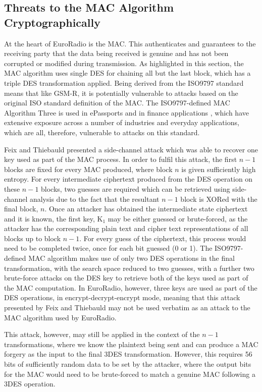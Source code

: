 \documentclass[twoside,11pt,a4paper]{article}
\begin{document}
\subsection{Threats to the MAC Algorithm Cryptographically}
At the heart of EuroRadio is the MAC. This authenticates and guarantees to the receiving party that the data being received is genuine and has not been corrupted or modified during transmission. As highlighted in this section, the MAC algorithm uses single DES for chaining all but the last block, which has a triple DES transformation applied. Being derived from the ISO9797 standard means that like GSM-R, it is potentially vulnerable to attacks based on the original ISO standard definition of the MAC. The ISO9797-defined MAC Algorithm Three is used in ePassports \citep{Chothia10a} and in finance applications \citep{IBM}, which have extensive exposure across a number of industries and everyday applications, which are all, therefore, vulnerable to attacks on this standard.

Feix and Thiebauld \citep{MACAlgo3SideChannel} presented a side-channel attack which was able to recover one key used as part of the MAC process. In order to fulfil this attack, the first $n - 1$ blocks are fixed for every MAC produced, where block $n$ is given sufficiently high entropy. For every intermediate ciphertext produced from the DES operation on these $n - 1$ blocks, two guesses are required which can be retrieved using side-channel analysis due to the fact that the resultant $n - 1$ block is XORed with the final block, $n$. Once an attacker has obtained the intermediate state ciphertext and it is known, the first key, K$_1$ may be either guessed or brute-forced, as the attacker has the corresponding plain text and cipher text representations of all blocks up to block $n - 1$. For every guess of the ciphertext, this process would need to be completed twice, once for each bit guessed (0 or 1). The ISO9797-defined MAC algorithm makes use of only two DES operations in the final transformation, with the search space reduced to two guesses, with a further two brute-force attacks on the DES key to retrieve both of the keys used as part of the MAC computation. In EuroRadio, however, three keys are used as part of the DES operations, in encrypt-decrypt-encrypt mode, meaning that this attack presented by Feix and Thiebauld may not be used verbatim as an attack to the MAC algorithm used by EuroRadio.

This attack, however, may still be applied in the context of the $n - 1$ transformations, where we know the plaintext being sent and can produce a MAC forgery as the input to the final 3DES transformation. However, this requires 56 bits of sufficiently random data to be set by the attacker, where the output bits for the MAC would need to be brute-forced to match a genuine MAC following a 3DES operation. 
\end{document}
